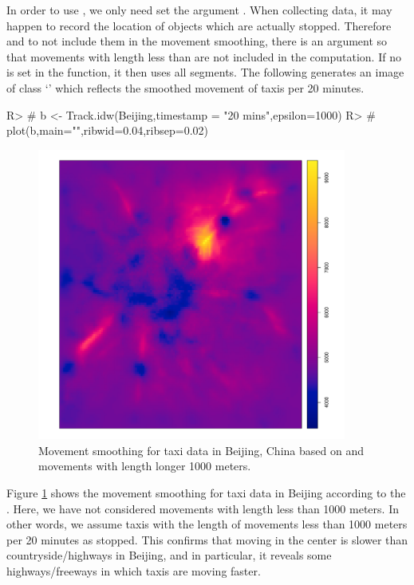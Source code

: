 \documentclass[article]{jss}
\newcommand{\class}[1]{`\code{#1}'}
\begin{document}
  In order to use , we only need set the argument . When collecting data, it may happen to record the location of objects which are actually stopped. Therefore and to not include them in the movement smoothing, there is an argument  so that movements with length less than  are not included in the computation. If no  is set in the function, it then uses all segments. 
  The following  generates an image of class \class{im} which reflects the smoothed movement of taxis per 20 minutes.
\begin{Schunk}
\begin{Sinput}
R> # b <- Track.idw(Beijing,timestamp = "20 mins",epsilon=1000)
R> # plot(b,main="",ribwid=0.04,ribsep=0.02)
\end{Sinput}
\end{Schunk}

  \begin{figure}[!h]
  \centering
  \includegraphics[width = 4in]{idw}
  \caption{Movement smoothing for taxi data in Beijing, China based on  and movements with length longer 1000 meters.}
  \label{idwBeijing}
  \end{figure}
  Figure \ref{idwBeijing} shows the movement smoothing for taxi data in Beijing according to the . Here, we have not considered movements with length less than 1000 meters. In other words, we assume taxis with the length of movements less than 1000 meters per 20 minutes as stopped. This confirms that moving in the center is slower than countryside/highways in Beijing, and in particular, it reveals some highways/freeways in which taxis are moving faster.
\end{document}
